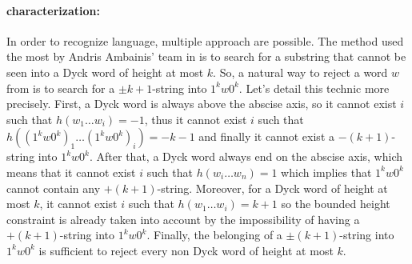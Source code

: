 \paragraph*{\textbf{ characterization:}}
In order to recognize  language, multiple approach are possible.
The method used the most by Andris Ambainis' team in \cite{art:2DGrid}
is to search for a substring that cannot be seen into a Dyck word of
height at most $k$. So, a natural way to reject a word $w$ from 
is to search for a $\pm k+1$-string into $1^k w0^k$. Let's detail this
technic more precisely. First, a Dyck word is always above the abscise
axis, so it cannot exist $i$ such that $h(w_1 \ldots w_i)=-1$, thus it
cannot exist $i$ such that $h((1^k w0^k)_1 \ldots (1^k w0^k)_i)=-k-1$
and finally it cannot exist a $-(k+1)$-string into $1^k w0^k$. After
that, a Dyck word always end on the abscise axis, which means that it
cannot exist $i$ such that $h(w_i \ldots w_n)=1$ which implies that
$1^k w0^k$ cannot contain any $+(k+1)$-string. Moreover, for a Dyck
word of height at most $k$, it cannot exist $i$ such that $h(w_1\ldots w_i)
    = k+1$ so the bounded height constraint is already taken into account
by the  impossibility of having a $+(k+1)$-string into $1^k w0^k$.
Finally, the belonging of a $\pm(k+1)$-string into $1^k w0^k$ is
sufficient to reject every non Dyck word of height at most $k$.

